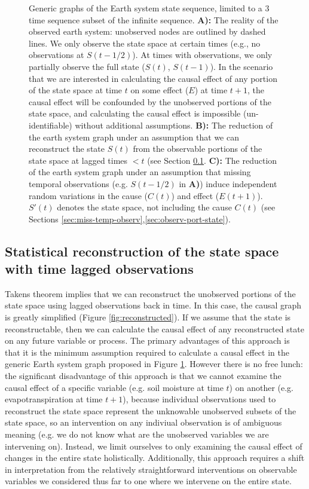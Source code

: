 \documentclass[12pt]{article}
\begin{document}
\begin{figure}
  
  \caption{Generic graphs of the Earth system state sequence, limited
    to a 3 time sequence subset of the infinite sequence. \textbf{A):}
    The reality of the observed earth system: unobserved nodes are
    outlined by dashed lines. We only observe the state space at
    certain times (e.g., no observations at $S(t-1/2)$). At times with
    observations, we only partially observe the full state ($S(t)$,
    $S(t-1)$). In the scenario that we are interested in calculating
    the causal effect of any portion of the state space at time $t$ on
    some effect ($E$) at time $t+1$, the causal effect will be
    confounded by the unobserved portions of the state space, and
    calculating the causal effect is impossible (un-identifiable)
    without additional assumptions. \textbf{B):} The reduction of the
    earth system graph under an assumption that we can reconstruct the
    state $S(t)$ from the observable portions of the state space at
    lagged times $< t$ (see Section
    \ref{sec:stat-reconstr-state}. \textbf{C):} The reduction of the
    earth system graph under an assumption that missing temporal
    observations (e.g. $S(t-1/2)$ in \textbf{A)}) induce independent
    random variations in the cause ($C(t)$) and effect
    ($E(t+1)$). $S'(t)$ denotes the state space, not including the
    cause $C(t)$ (see Sections
    \ref{sec:miss-temp-observ},\ref{sec:observ-port-state}).}
  \label{fig:generic}
\end{figure}

\subsection{Statistical reconstruction of the state space with time
  lagged observations}
\label{sec:stat-reconstr-state}

Takens theorem implies that we can reconstruct the unobserved portions
of the state space using lagged observations back in time. In this
case, the causal graph is greatly simplified (Figure
\ref{fig:reconstructed}). If we assume that the state is
reconstructable, then we can calculate the causal effect of any
reconstructed state on any future variable or process. The primary
advantages of this approach is that it is the minimum assumption
required to calculate a causal effect in the generic Earth system
graph proposed in Figure \ref{fig:generic}. However there is no free
lunch: the significant disadvantage of this approach is that we cannot
examine the causal effect of a specific variable (e.g. soil moisture
at time $t$) on another (e.g. evapotranspiration at time $t+1$),
because individual observations used to reconstruct the state space
represent the unknowable unobserved subsets of the state space, so an
intervention on any indiviual observation is of ambiguous meaning
(e.g. we do not know what are the unobserved variables we are
intervening on). Instead, we limit ourselves to only examining the
causal effect of changes in the entire state
holistically. Additionally, this approach requires a shift in
interpretation from the relatively straightforward interventions on
observable variables we considered thus far to one where we intervene
on the entire state.
\end{document}
